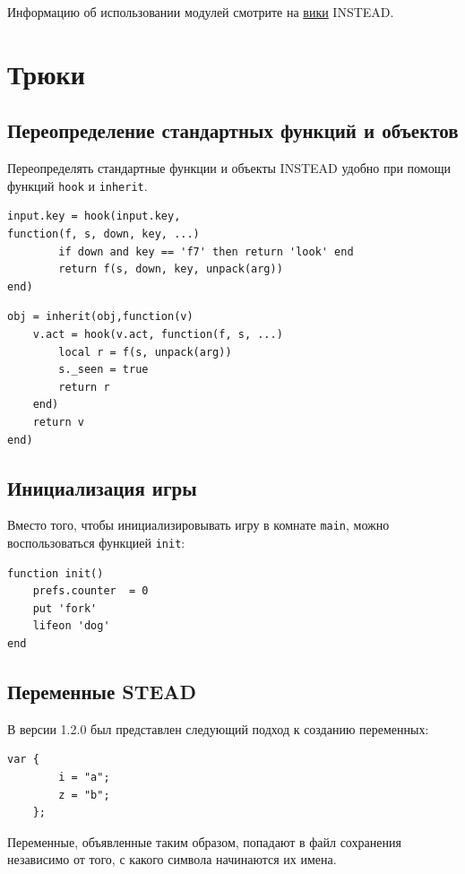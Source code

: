 \documentclass[a4paper,12pt]{article}
\begin{document}
Информацию об использовании модулей смотрите на \href{http://instead.pinebrush.com/wiki/ru/gamedev/modules}{вики} INSTEAD.

\section{Трюки}
\subsection{Переопределение стандартных функций и объектов}


Переопределять стандартные функции и объекты INSTEAD удобно при помощи функций \verb/hook/ и \verb/inherit/.

\begin{verbatim}
input.key = hook(input.key,
function(f, s, down, key, ...)
        if down and key == 'f7' then return 'look' end
        return f(s, down, key, unpack(arg))
end)
\end{verbatim}
\begin{verbatim}
obj = inherit(obj,function(v)
    v.act = hook(v.act, function(f, s, ...)
        local r = f(s, unpack(arg))
        s._seen = true
        return r
    end)
    return v
end)
\end{verbatim}
\subsection{Инициализация игры}
Вместо того, чтобы инициализировывать игру в комнате \verb/main/, можно воспользоваться функцией \verb/init/:
\begin{verbatim}
function init()
    prefs.counter  = 0
    put 'fork'
    lifeon 'dog'
end
\end{verbatim}
\subsection{Переменные STEAD}
В версии 1.2.0 был представлен следующий подход к созданию переменных:

\begin{verbatim}
var {
        i = "a";
        z = "b";
    };
\end{verbatim}

Переменные, объявленные таким образом, попадают в файл сохранения независимо от того, с какого символа начинаются их имена.
\end{document}
